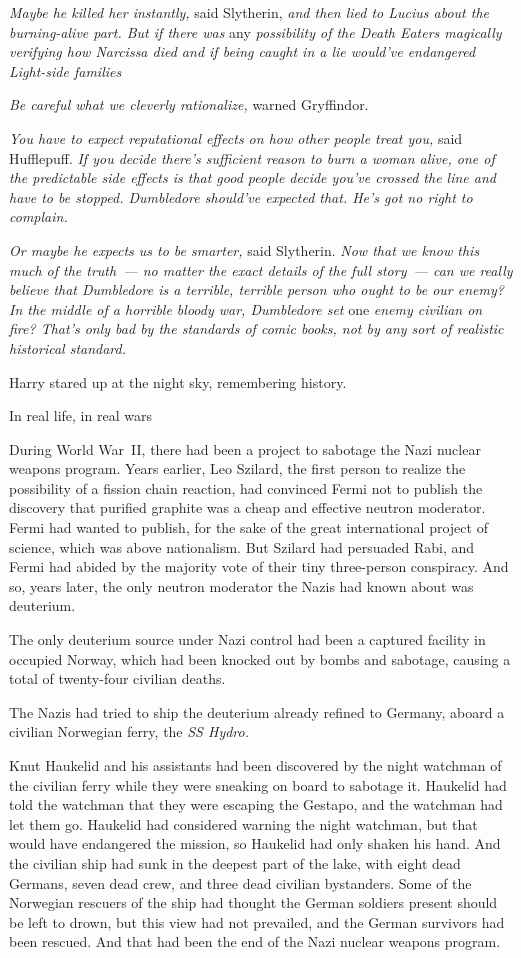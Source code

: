 \emph{Maybe he killed her instantly,} said Slytherin, \emph{and then lied to
Lucius about the burning-alive part. But{\el} if there was} any
\emph{possibility of the Death Eaters magically verifying how Narcissa
died{\el} and if being caught in a lie would've endangered Light-side
families{\el}}

\emph{Be careful what we cleverly rationalize,} warned Gryffindor.

\emph{You have to expect reputational effects on how other people treat you,}
said Hufflepuff. \emph{If you decide there's sufficient reason to burn a woman
alive, one of the predictable side effects is that good people decide you've
crossed the line and have to be stopped. Dumbledore should've expected that.
He's got no right to complain.}

\emph{Or maybe he expects us to be smarter,} said Slytherin. \emph{Now that we
know this much of the truth~--- no matter the exact details of the full
story~--- can we really believe that Dumbledore is a terrible, terrible person
who ought to be our enemy? In the middle of a horrible bloody war, Dumbledore
set} one \emph{enemy civilian on fire? That's only bad by the standards of
comic books, not by any sort of realistic historical standard.}

Harry stared up at the night sky, remembering history.

In real life, in real wars{\el}

During World War~II, there had been a project to sabotage the Nazi nuclear
weapons program. Years earlier, Leo Szilard, the first person to realize the
possibility of a fission chain reaction, had convinced Fermi not to publish the
discovery that purified graphite was a cheap and effective neutron moderator.
Fermi had wanted to publish, for the sake of the great international project of
science, which was above nationalism. But Szilard had persuaded Rabi, and Fermi
had abided by the majority vote of their tiny three-person conspiracy. And so,
years later, the only neutron moderator the Nazis had known about was deuterium.

The only deuterium source under Nazi control had been a captured facility in
occupied Norway, which had been knocked out by bombs and sabotage, causing a
total of twenty-four civilian deaths.

The Nazis had tried to ship the deuterium already refined to Germany, aboard a
civilian Norwegian ferry, the \emph{SS Hydro.}

Knut Haukelid and his assistants had been discovered by the night watchman of
the civilian ferry while they were sneaking on board to sabotage it. Haukelid
had told the watchman that they were escaping the Gestapo, and the watchman had
let them go. Haukelid had considered warning the night watchman, but that would
have endangered the mission, so Haukelid had only shaken his hand. And the
civilian ship had sunk in the deepest part of the lake, with eight dead
Germans, seven dead crew, and three dead civilian bystanders. Some of the
Norwegian rescuers of the ship had thought the German soldiers present should
be left to drown, but this view had not prevailed, and the German survivors had
been rescued. And that had been the end of the Nazi nuclear weapons program.

